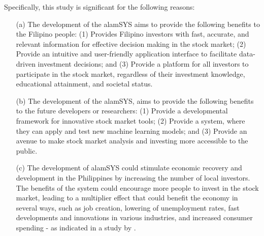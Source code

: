 Specifically, this study is significant for the following reasons:
\begin{itemize}
  \item[(a)] The development of the alamSYS aims to provide the 
  following benefits to the Filipino people:
  (1)	Provides Filipino investors with fast, accurate,
  and relevant information for effective decision making in the stock market;
  (2)	Provide an intuitive and user-friendly application interface to 
  facilitate data-driven investment decisions; and 
  (3)	Provide a platform for all investors to participate in the stock market, regardless of their investment knowledge, educational attainment, and societal status.
  
  \item[(b)] The development of the alamSYS, aims to provide the following benefits 
  to the future developers or researchers:
  (1)	Provide a developmental framework for innovative stock market tools;
  (2)	Provide a system, where they can apply and test new machine learning
  models; and
  (3)	Provide an avenue to make stock market analysis and investing more
    accessible to the public.

  \item[(c)] The development of alamSYS could stimulate economic recovery and 
  development in the Philippines by increasing the number of local investors. 
  The benefits of the system could encourage more people to invest in the stock 
  market, leading to a multiplier effect that could benefit the economy 
  in several ways, such as job creation, lowering of unemployment rates, 
  fast developments and innovations in various industries, and increased consumer 
  spending - as indicated in a study by .
\end{itemize}